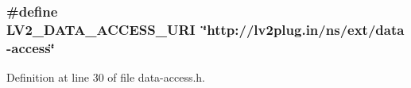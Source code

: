 \subsubsection[{\texorpdfstring{L\+V2\+\_\+\+D\+A\+T\+A\+\_\+\+A\+C\+C\+E\+S\+S\+\_\+\+U\+RI}{LV2_DATA_ACCESS_URI}}]{\setlength{\rightskip}{0pt plus 5cm}\#define L\+V2\+\_\+\+D\+A\+T\+A\+\_\+\+A\+C\+C\+E\+S\+S\+\_\+\+U\+RI~\char`\"{}http\+://{\bf lv2plug.\+in}/{\bf ns}/ext/{\bf data}-\/access\char`\"{}}\hypertarget{data-access_8h_af799dc9396bb1181aa026df724b662a2}{}\label{data-access_8h_af799dc9396bb1181aa026df724b662a2}


Definition at line 30 of file data-\/access.\+h.

